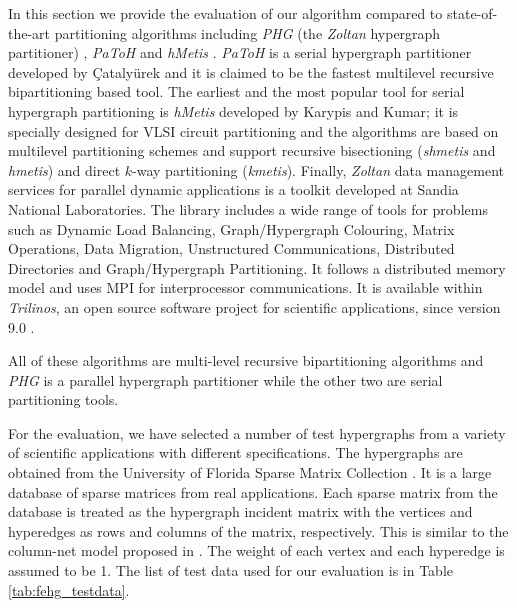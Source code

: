 \documentclass[twocolumn]{svjour3}          \smartqed
\begin{document}
In this section we provide the evaluation of our algorithm compared to state-of-the-art partitioning algorithms including \textit{PHG} (the  \textit{Zoltan} hypergraph partitioner) \cite{devetal2006}, \textit{PaToH} \cite{ccatalyurek2011patoh} and \textit{hMetis} \cite{hmetis15url}. \textit{PaToH} is a serial hypergraph partitioner developed by \c{C}ataly\"{u}rek 
and it is claimed to be the fastest multilevel recursive bipartitioning based tool. The earliest and the most popular tool for serial hypergraph partitioning is \textit{hMetis} developed by Karypis and Kumar; it is specially designed for VLSI circuit partitioning and the algorithms are based on multilevel partitioning schemes and support recursive bisectioning (\textit{shmetis} and  \textit{hmetis}) and direct {$k$-way} partitioning (\textit{kmetis}). Finally, \textit{Zoltan} data management services for parallel dynamic applications is a toolkit developed at Sandia National Laboratories. The library includes a wide range of tools for problems such as Dynamic Load Balancing, Graph/Hypergraph Colouring, Matrix Operations, Data Migration, Unstructured Communications, Distributed Directories and Graph/Hypergraph Partitioning. It follows a distributed memory model and uses MPI for interprocessor communications. It is available within \textit{Trilinos}, an open source software project for scientific applications, since version 9.0 \cite{trilinosurl}.  

All of these algorithms are multi-level recursive bipartitioning algorithms and \textit{PHG} is a parallel hypergraph partitioner while the other two are serial partitioning tools. 


For the evaluation, we have selected a number of test hypergraphs from a variety of  scientific applications with different specifications. The hypergraphs are obtained from the University of Florida Sparse Matrix Collection \cite{sparsecollection2011}. It is a large database of sparse matrices from real applications. Each sparse matrix from the database is treated as the hypergraph incident matrix with the vertices and hyperedges as rows and columns of the matrix, respectively. This is similar to the column-net model proposed in \cite{catayk1999}. The weight of each vertex and each hyperedge is assumed to be 1. The list of test data used for our evaluation is in Table \ref{tab:fehg_testdata}. 
\end{document}
